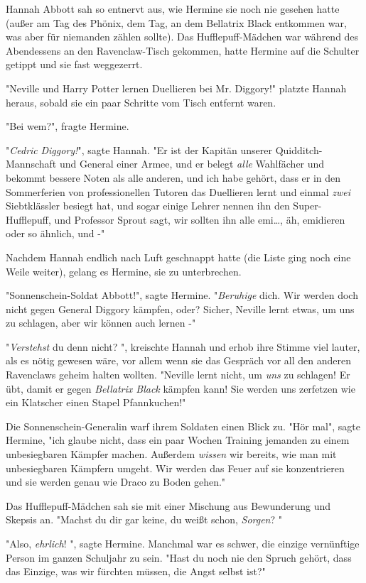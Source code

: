 {Hannah Abbott sah so entnervt aus, wie Hermine sie noch nie gesehen hatte (außer am Tag des Phönix, dem Tag, an dem Bellatrix Black entkommen war, was aber für niemanden zählen sollte). Das Hufflepuff-Mädchen war während des Abendessens an den Ravenclaw-Tisch gekommen, hatte Hermine auf die Schulter getippt und sie fast weggezerrt.

"Neville und Harry Potter lernen Duellieren bei Mr. Diggory!" platzte Hannah heraus, sobald sie ein paar Schritte vom Tisch entfernt waren.

"Bei wem?", fragte Hermine.

"\emph{Cedric} \emph{Diggory!}", sagte Hannah. "Er ist der Kapitän unserer Quidditch-Mannschaft und General einer Armee, und er belegt \emph{alle} Wahlfächer und bekommt bessere Noten als alle anderen, und ich habe gehört, dass er in den Sommerferien von professionellen Tutoren das Duellieren lernt und einmal \emph{zwei} Siebtklässler besiegt hat, und sogar einige Lehrer nennen ihn den Super-Hufflepuff, und Professor Sprout sagt, wir sollten ihn alle emi…, äh, emidieren oder so ähnlich, und -"

Nachdem Hannah endlich nach Luft geschnappt hatte (die Liste ging noch eine Weile weiter), gelang es Hermine, sie zu unterbrechen.

"Sonnenschein-Soldat Abbott!", sagte Hermine. "\emph{Beruhige} dich. Wir werden doch nicht gegen General Diggory kämpfen, oder? Sicher, Neville lernt etwas, um uns zu schlagen, aber wir können auch lernen -"

"\emph{Verstehst} du denn nicht? ", kreischte Hannah und erhob ihre Stimme viel lauter, als es nötig gewesen wäre, vor allem wenn sie das Gespräch vor all den anderen Ravenclaws geheim halten wollten. "Neville lernt nicht, um \emph{uns} zu schlagen! Er übt, damit er gegen \emph{Bellatrix Black} kämpfen kann! Sie werden uns zerfetzen wie ein Klatscher einen Stapel Pfannkuchen!"

Die Sonnenschein-Generalin warf ihrem Soldaten einen Blick zu. "Hör mal", sagte Hermine, "ich glaube nicht, dass ein paar Wochen Training jemanden zu einem unbesiegbaren Kämpfer machen. Außerdem \emph{wissen} wir bereits, wie man mit unbesiegbaren Kämpfern umgeht. Wir werden das Feuer auf sie konzentrieren und sie werden genau wie Draco zu Boden gehen."

Das Hufflepuff-Mädchen sah sie mit einer Mischung aus Bewunderung und Skepsis an. "Machst du dir gar keine, du weißt schon, \emph{Sorgen}? "

"Also, \emph{ehrlich}! ", sagte Hermine. Manchmal war es schwer, die einzige vernünftige Person im ganzen Schuljahr zu sein. "Hast du noch nie den Spruch gehört, dass das Einzige, was wir fürchten müssen, die Angst selbst ist?"

}

